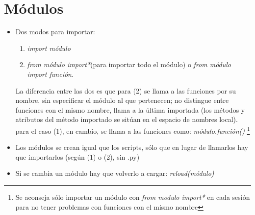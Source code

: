 \section{Módulos}\label{modulos}


	\begin{itemize}
	\item Dos modos para importar:

		\begin{enumerate}
			\item \textit{import módulo} 
			\item \textit{from módulo import*}(para importar todo el módulo) o \textit{from módulo import función}. 
		\end{enumerate}

	La diferencia entre las dos es que para (2) se llama a las funciones por su nombre, sin especificar el módulo al que pertenecen; no distingue entre funciones con el mismo nombre, llama a la última importada (los métodos y atributos del método importado se sitúan en el espacio de nombres local). para el caso (1), en cambio, se llama a las funciones como: \textit{módulo.función()} \footnote{Se aconseja sólo importar un módulo con \textit{from modulo import*} en cada sesión para no tener problemas con funciones con el mismo nombre} 

	\item Los módulos se crean igual que los scripts, sólo que en lugar de llamarlos hay que importarlos (según (1) o (2), sin .py)
	\item Si se cambia un módulo hay que volverlo a cargar: \textit{reload(módulo)}


\end{itemize}
